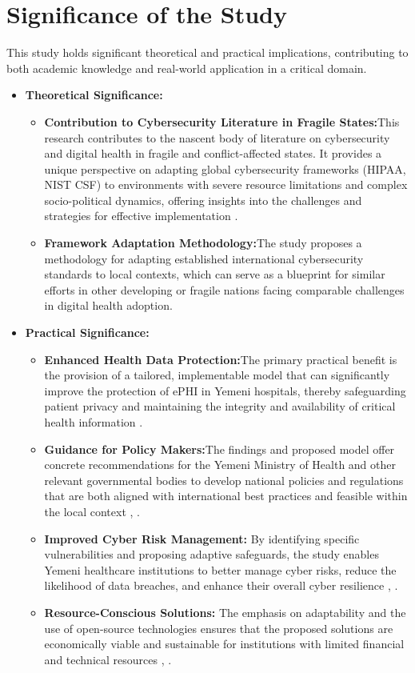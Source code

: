 \documentclass[12pt, a4paper, oneside]{report}
\begin{document}
	\section{Significance of the Study}
	This study holds significant theoretical and practical implications, contributing to both academic knowledge and real-world application in a critical domain.
		\begin{itemize}
		\item \textbf{Theoretical Significance:}
			\begin{itemize}
				\item[-]\textbf{ Contribution to Cybersecurity Literature in Fragile States:}This research contributes to the nascent body of literature on cybersecurity and digital health in fragile and conflict-affected states. It provides a unique perspective on adapting global cybersecurity frameworks (HIPAA, NIST CSF) to environments with severe resource limitations and complex socio-political dynamics, offering insights into the challenges and strategies for effective implementation \cite{nist2024sp80066r2}.
				\item [-]\textbf{ Framework Adaptation Methodology:}The study proposes a methodology for adapting established international cybersecurity standards to local contexts, which can serve as a blueprint for similar efforts in other developing or fragile nations facing comparable challenges in digital health adoption.
			\end{itemize}
		\item \textbf{Practical Significance:}
			\begin{itemize}
				\item [-] \textbf{ Enhanced Health Data Protection:}The primary practical benefit is the provision of a tailored, implementable model that can significantly improve the protection of ePHI in Yemeni hospitals, thereby safeguarding patient privacy and maintaining the integrity and availability of critical health information \cite{hhs2024hipaa}.
				\item [-] \textbf{ Guidance for Policy Makers:}The findings and proposed model offer concrete recommendations for the Yemeni Ministry of Health and other relevant governmental bodies to develop national policies and regulations that are both aligned with international best practices and feasible within the local context \cite{hasegawa2024cybersecurity}, \cite{saad2025fuzzy}.
				\item [-] \textbf{Improved Cyber Risk Management:} By identifying specific vulnerabilities and proposing adaptive safeguards, the study enables Yemeni healthcare institutions to better manage cyber risks, reduce the likelihood of data breaches, and enhance their overall cyber resilience \cite{al2023information}, \cite{melaku2023context}.
				\item [-] \textbf{ Resource-Conscious Solutions:} The emphasis on adaptability and the use of open-source technologies ensures that the proposed solutions are economically viable and sustainable for institutions with limited financial and technical resources \cite{hasegawa2024cybersecurity}, \cite{saad2025fuzzy}.
			\end{itemize}
	\end{itemize}
\end{document}
